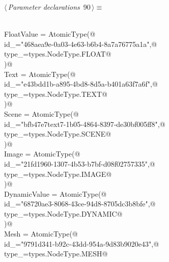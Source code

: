 \documentclass[
    a4paper,      %
    10pt,         %
    openright,    %
    notitlepage,  %
    parskip=half, %
]{scrreprt}       %
\theoremstyle{definition}                    %
\begin{document}
\begin{flushleft} \small
\begin{minipage}{\linewidth}\label{scrap147}\raggedright\small
{} $\langle\,${\itshape Parameter declarations}\nobreak\ {\footnotesize {90}}$\,\rangle\equiv$
\vspace{-1exm}
\begin{list}{}{} \item
\mbox{}\lstinline@@\\
\mbox{}\lstinline@    FloatValue = AtomicType(@\\
\mbox{}\lstinline@        id_="468aea9e-0a03-4e63-b6b4-8a7a76775a1a",@\\
\mbox{}\lstinline@        type_=types.NodeType.FLOAT@\\
\mbox{}\lstinline@    )@\\
\mbox{}\lstinline@    Text = AtomicType(@\\
\mbox{}\lstinline@        id_="e43bdd1b-a895-4bd8-8d5a-b401a63f7a6f",@\\
\mbox{}\lstinline@        type_=types.NodeType.TEXT@\\
\mbox{}\lstinline@    )@\\
\mbox{}\lstinline@    Scene = AtomicType(@\\
\mbox{}\lstinline@        id_="bfb47e7text7-1b05-4864-8397-de30bf005ff8",@\\
\mbox{}\lstinline@        type_=types.NodeType.SCENE@\\
\mbox{}\lstinline@    )@\\
\mbox{}\lstinline@    Image = AtomicType(@\\
\mbox{}\lstinline@        id_="21fd1960-1307-4b53-b7bf-d08f02757335",@\\
\mbox{}\lstinline@        type_=types.NodeType.IMAGE@\\
\mbox{}\lstinline@    )@\\
\mbox{}\lstinline@    DynamicValue = AtomicType(@\\
\mbox{}\lstinline@        id_="68720ae3-8068-43ce-94d8-8705dc3b8bfe",@\\
\mbox{}\lstinline@        type_=types.NodeType.DYNAMIC@\\
\mbox{}\lstinline@    )@\\
\mbox{}\lstinline@    Mesh = AtomicType(@\\
\mbox{}\lstinline@        id_="9791d341-b92c-43dd-954a-9d83b9020e43",@\\
\mbox{}\lstinline@        type_=types.NodeType.MESH@\\

\end{list}
\end{minipage}
\end{flushleft}
\end{document}
